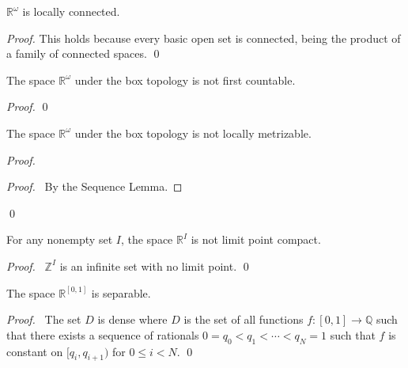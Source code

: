 \begin{prop}
 $\mathbb{R}^\omega$ is locally connected.
\end{prop}

\begin{proof}
\pf This holds because every basic open set is connected, being the product
of a family of connected spaces. \qed
\end{proof}

\begin{prop}
The space $\mathbb{R}^\omega$ under the box topology is not first countable.
\end{prop}

\begin{proof}
\pf
{}
\qed
\end{proof}

\begin{prop}
The space $\mathbb{R}^\omega$ under the box topology is not locally metrizable.
\end{prop}

\begin{proof}
\pf
{}
\begin{proof}
  \pf\ By the Sequence Lemma.
\end{proof}
\qed
\end{proof}

\begin{prop}
For any nonempty set $I$, the space $\mathbb{R}^I$ is not limit point compact.
\end{prop}

\begin{proof}
\pf\ $\mathbb{Z}^I$ is an infinite set with no limit point. \qed
\end{proof}

\begin{prop}
The space $\mathbb{R}^{[0,1]}$ is separable.
\end{prop}

\begin{proof}
\pf\ The set $D$ is dense where $D$ is the set of all functions $f : [0,1]
\rightarrow \mathbb{Q}$ such that there exists a sequence of rationals $0 = q_0
< q_1 < \cdots < q_N = 1$ such that $f$ is constant on $[q_i, q_{i+1})$ for $0
\leq i < N$. \qed
\end{proof}

